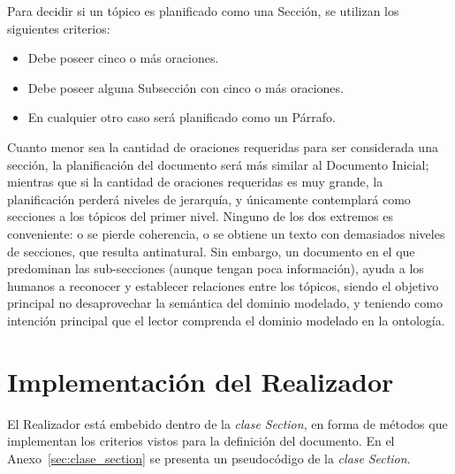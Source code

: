 Para decidir si un tópico es planificado como una Sección, se utilizan los siguientes criterios:
\begin{itemize}
    \item Debe poseer cinco o más oraciones.
    \item Debe poseer alguna Subsección con cinco o más oraciones.
    \item En cualquier otro caso será planificado como un Párrafo.
\end{itemize}



Cuanto menor sea la cantidad de oraciones requeridas para ser considerada una sección,  la planificación del documento será más similar al Documento Inicial; mientras que si la cantidad de  oraciones requeridas es muy grande, la planificación perderá niveles de jerarquía, y únicamente contemplará como secciones a los tópicos del primer nivel. Ninguno de los dos extremos es conveniente: o se pierde coherencia, o se obtiene un texto con demasiados niveles de secciones, que resulta antinatural. Sin embargo, un documento en el que predominan las sub-secciones (aunque tengan poca información), ayuda a los humanos a reconocer y establecer relaciones entre los tópicos, siendo el objetivo principal no desaprovechar la semántica del dominio modelado, y teniendo como intención principal que el lector comprenda el dominio modelado en la ontología.


\section{Implementación del Realizador}
El Realizador está embebido dentro de la \textit{clase }\textit{Section}, en forma de métodos que implementan los criterios vistos para la definición del documento. En el Anexo~\ref{sec:clase_section} se presenta un pseudocódigo de la\textit{ clase }\textit{Section}.

